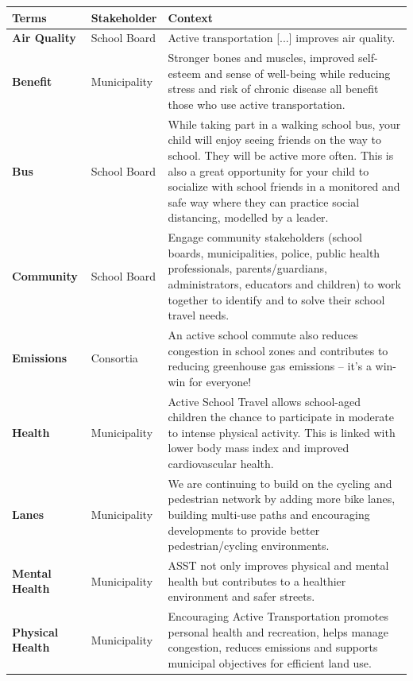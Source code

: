 \documentclass[]{elsarticle} %
\begin{document}
\begin{table}
\centering
\begin{tabular}[t]{>{}l|l|>{\raggedright\arraybackslash}p{30em}}
\hline
Terms & Stakeholder & Context\\
\hline
\textbf{Air Quality} & School Board & Active transportation [...] improves air quality.\\
\hline
\textbf{Benefit} & Municipality & Stronger bones and muscles, improved self-esteem and sense of well-being while reducing stress and risk of chronic disease all benefit those who use active transportation.\\
\hline
\textbf{Bus} & School Board & While taking part in a walking school bus, your child will enjoy seeing friends on the way to school. They will be active more often. This is also a great opportunity for your child to socialize with school friends in a monitored and safe way where they can practice social distancing, modelled by a leader.\\
\hline
\textbf{Community} & School Board & Engage community stakeholders (school boards, municipalities, police, public health professionals, parents/guardians, administrators, educators and children) to work together to identify and to solve their school travel needs.\\
\hline
\textbf{Emissions} & Consortia & An active school commute also reduces congestion in school zones and contributes to reducing greenhouse gas emissions – it’s a win-win for everyone!\\
\hline
\textbf{Health} & Municipality & Active School Travel allows school-aged children the chance to participate in moderate to intense physical activity. This is linked with lower body mass index and improved cardiovascular health.\\
\hline
\textbf{Lanes} & Municipality & We are continuing to build on the cycling and pedestrian network by adding more bike lanes, building multi-use paths and encouraging developments to provide better pedestrian/cycling environments.\\
\hline
\textbf{Mental Health} & Municipality & ASST not only improves physical and mental health but contributes to a healthier environment and safer streets.\\
\hline
\textbf{Physical Health} & Municipality & Encouraging Active Transportation promotes personal health and recreation, helps manage congestion, reduces emissions and supports municipal objectives for efficient land use.\\
\hline
\end{tabular}
\end{table}
\end{document}

